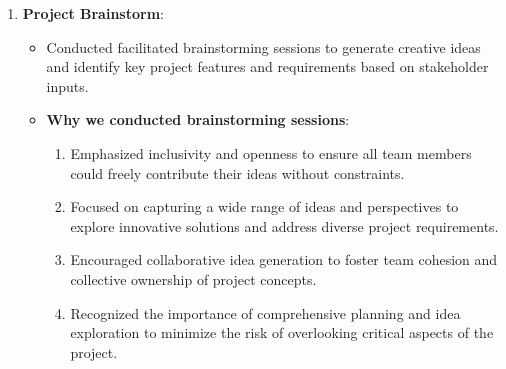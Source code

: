 \begin{enumerate}
    \item \textbf{Project Brainstorm}:
    \begin{itemize}
        \item Conducted facilitated brainstorming sessions to generate creative ideas and identify key project features and requirements based on stakeholder inputs.
        \item \textbf{Why we conducted brainstorming sessions}:
            \begin{enumerate}
                \item Emphasized inclusivity and openness to ensure all team members could freely contribute their ideas without constraints.
                \item Focused on capturing a wide range of ideas and perspectives to explore innovative solutions and address diverse project requirements.
                \item Encouraged collaborative idea generation to foster team cohesion and collective ownership of project concepts.
                \item Recognized the importance of comprehensive planning and idea exploration to minimize the risk of overlooking critical aspects of the project.
            \end{enumerate}
    \end{itemize}




\end{enumerate}
